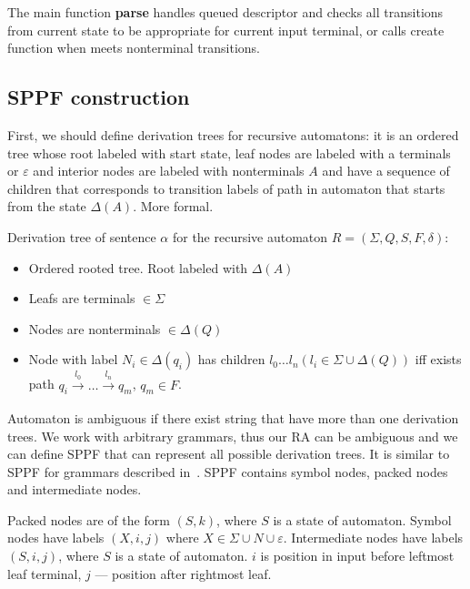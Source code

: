 \documentclass[runningheads,a4paper]{llncs}
\begin{document}


The main function \textbf{parse} handles queued descriptor and checks all transitions from current state to be appropriate
for current input terminal, or calls create function when meets nonterminal transitions.


\subsection{SPPF construction}

First, we should define derivation trees for recursive automatons: it is an ordered tree whose root labeled with start state,
leaf nodes are labeled with a terminals or $\varepsilon$ and interior nodes are labeled with 
nonterminals $A$ and have a sequence of children that corresponds to transition labels of path in 
automaton that starts from the state $\Delta(A)$. More formal. 

\begin{mydef}

Derivation tree of sentence $\alpha$ for the recursive automaton $R=(\Sigma, Q, S, F, \delta)$:%

\begin{itemize}
\item Ordered rooted tree. Root labeled with $\Delta(A)$
\item Leafs are terminals $\in \Sigma$
\item Nodes are nonterminals $\in \Delta(Q)$
\item Node with label $N_i \in \Delta(q_i)$ has children $l_0 \dots l_n (l_i \in \Sigma \cup \Delta(Q))$ iff exists
path
$q_i \xrightarrow[]{l_0} \dots \xrightarrow{l_n} q_m$, $q_m \in F$. 
\end{itemize}

\end{mydef}

Automaton is ambiguous if there exist string that have more than one derivation trees. 
We work with arbitrary grammars, thus our RA can be ambiguous and we can define SPPF that can represent all possible derivation trees.
It is similar to SPPF for grammars described in~\cite{scott2013gll}. SPPF contains symbol nodes, packed nodes
and intermediate nodes. 

Packed nodes are of the form $(S, k)$, where $S$ is a state of automaton. 
Symbol nodes have labels $(X, i, j)$ where $X \in \Sigma \cup N \cup \varepsilon$. 
Intermediate nodes have labels $ (S, i, j) $, where $S$ is a state of automaton. $i$ is position in input before leftmost leaf terminal, $j$ --- position after rightmost leaf.
\end{document}
